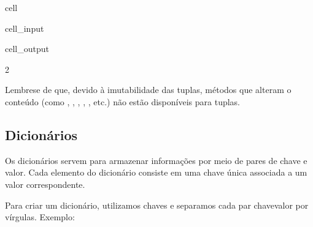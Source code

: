 \documentclass[letterpaper,10pt,english]{jupyterBook}
\begin{document}
\begin{sphinxuseclass}{cell}\begin{sphinxVerbatimInput}

\begin{sphinxuseclass}{cell_input}
\begin{sphinxVerbatim}[commandchars=\\\{\}]
      
  
\end{sphinxVerbatim}

\end{sphinxuseclass}\end{sphinxVerbatimInput}
\begin{sphinxVerbatimOutput}

\begin{sphinxuseclass}{cell_output}
\begin{sphinxVerbatim}[commandchars=\\\{\}]
2
\end{sphinxVerbatim}

\end{sphinxuseclass}\end{sphinxVerbatimOutput}

\end{sphinxuseclass}
\sphinxAtStartPar
Lembre\sphinxhyphen{}se de que, devido à imutabilidade das tuplas, métodos que alteram o conteúdo (como , , , , , etc.) não estão disponíveis para tuplas.


\subsection{Dicionários}
\label{\detokenize{chapters/ch2/ch2:dicionarios}}
\sphinxAtStartPar
Os dicionários servem para armazenar informações por meio de pares de chave e valor. Cada elemento do dicionário consiste em uma chave única associada a um valor correspondente.

\sphinxAtStartPar
Para criar um dicionário, utilizamos chaves \sphinxcode{\sphinxupquote{\{\}}} e separamos cada par chave\sphinxhyphen{}valor por vírgulas. Exemplo:
\end{document}
